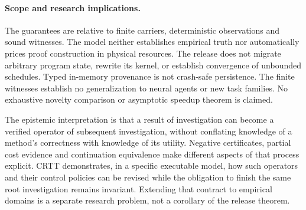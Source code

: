 \documentclass[10pt,letterpaper]{article}
\begin{document}
\paragraph{Scope and research implications.}
The guarantees are relative to finite carriers, deterministic observations and sound witnesses. The model neither establishes empirical truth nor automatically prices proof construction in physical resources. The release does not migrate arbitrary program state, rewrite its kernel, or establish convergence of unbounded schedules. Typed in-memory provenance is not crash-safe persistence. The finite witnesses establish no generalization to neural agents or new task families. No exhaustive novelty comparison or asymptotic speedup theorem is claimed.

The epistemic interpretation is that a result of investigation can become a verified operator of subsequent investigation, without conflating knowledge of a method's correctness with knowledge of its utility. Negative certificates, partial cost evidence and continuation equivalence make different aspects of that process explicit. CRTT demonstrates, in a specific executable model, how such operators and their control policies can be revised while the obligation to finish the same root investigation remains invariant. Extending that contract to empirical domains is a separate research problem, not a corollary of the release theorem.
\clearpage
\end{document}
